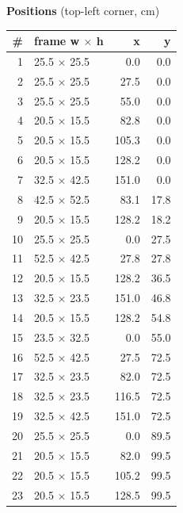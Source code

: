 \documentclass[a4paper,landscape,10pt]{article}
\begin{document}
\begin{minipage}[t]{0.25\textwidth}
\vspace{8pt}
{\bfseries Positions} (top-left corner, cm)\\[2pt]
\tiny
\begin{tabular}{@{}r l r r@{}}
\toprule
\# & frame w $\times$ h & x & y \\
\midrule
1 & 25.5 $\times$ 25.5 & 0.0 & 0.0 \\
2 & 25.5 $\times$ 25.5 & 27.5 & 0.0 \\
3 & 25.5 $\times$ 25.5 & 55.0 & 0.0 \\
4 & 20.5 $\times$ 15.5 & 82.8 & 0.0 \\
5 & 20.5 $\times$ 15.5 & 105.3 & 0.0 \\
6 & 20.5 $\times$ 15.5 & 128.2 & 0.0 \\
7 & 32.5 $\times$ 42.5 & 151.0 & 0.0 \\
8 & 42.5 $\times$ 52.5 & 83.1 & 17.8 \\
9 & 20.5 $\times$ 15.5 & 128.2 & 18.2 \\
10 & 25.5 $\times$ 25.5 & 0.0 & 27.5 \\
11 & 52.5 $\times$ 42.5 & 27.8 & 27.8 \\
12 & 20.5 $\times$ 15.5 & 128.2 & 36.5 \\
13 & 32.5 $\times$ 23.5 & 151.0 & 46.8 \\
14 & 20.5 $\times$ 15.5 & 128.2 & 54.8 \\
15 & 23.5 $\times$ 32.5 & 0.0 & 55.0 \\
16 & 52.5 $\times$ 42.5 & 27.5 & 72.5 \\
17 & 32.5 $\times$ 23.5 & 82.0 & 72.5 \\
18 & 32.5 $\times$ 23.5 & 116.5 & 72.5 \\
19 & 32.5 $\times$ 42.5 & 151.0 & 72.5 \\
20 & 25.5 $\times$ 25.5 & 0.0 & 89.5 \\
21 & 20.5 $\times$ 15.5 & 82.0 & 99.5 \\
22 & 20.5 $\times$ 15.5 & 105.2 & 99.5 \\
23 & 20.5 $\times$ 15.5 & 128.5 & 99.5 \\
\bottomrule
\end{tabular}
\end{minipage}
\clearpage
\end{document}
